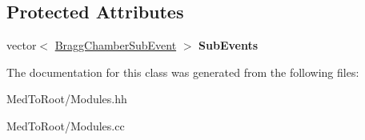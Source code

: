 \subsection*{Protected Attributes}
\begin{DoxyCompactItemize}
\item 
\hypertarget{class_bragg_chamber_aca89325f585002ab74998709253575e3}{vector$<$ \hyperlink{class_bragg_chamber_sub_event}{Bragg\-Chamber\-Sub\-Event} $>$ {\bfseries Sub\-Events}}\label{class_bragg_chamber_aca89325f585002ab74998709253575e3}

\end{DoxyCompactItemize}


The documentation for this class was generated from the following files\-:\begin{DoxyCompactItemize}
\item 
Med\-To\-Root/Modules.\-hh\item 
Med\-To\-Root/Modules.\-cc\end{DoxyCompactItemize}
